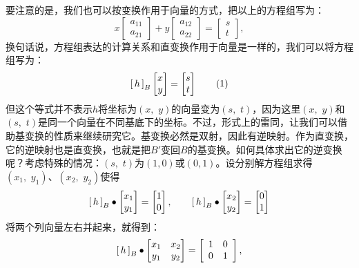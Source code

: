 \documentclass[12pt,UTF8]{ctexbook}
\begin{document}
要注意的是，我们也可以按变换作用于向量的方式，把以上的方程组写为：
$$ x\begin{bmatrix}
    a_{11}\\ a_{21} 
\end{bmatrix} + y \begin{bmatrix}
    a_{12}\\ a_{22}
\end{bmatrix} = \begin{bmatrix}
    s \\ t
\end{bmatrix},
$$
换句话说，方程组表达的计算关系和直变换作用于向量是一样的，我们可以将方程组写为：
\begin{equation*}
\bmat{h}[B] \begin{bmatrix}
    x\\y
\end{bmatrix}=\begin{bmatrix}
    s\\t
\end{bmatrix}\tag{1}
\end{equation*}
但这个等式并不表示$h$将坐标为$(x,\,\,y)$的向量变为$(s,\,\,t)$，因为这里$(x,\,\,y)$和$(s,\,\,t)$是同一个向量在不同基底下的坐标。不过，形式上的雷同，让我们可以借助基变换的性质来继续研究它。基变换必然是双射，因此有逆映射。作为直变换，它的逆映射也是直变换，也就是把$B'$变回$B$的基变换。如何具体求出它的逆变换呢？考虑特殊的情况：$(s,\,\,t)$为$(1,0)$或$(0,1)$。设分别解方程组求得$(x_1,\,\,y_1)$、$(x_2,\,\,y_2)$使得
$$
\bmat{h}[B]\bullet \begin{bmatrix}
    x_1\\y_1
\end{bmatrix}=\begin{bmatrix}
    1\\0
\end{bmatrix},\qquad
\bmat{h}[B]\bullet \begin{bmatrix}
    x_2\\y_2
\end{bmatrix}=\begin{bmatrix}
    0\\1
\end{bmatrix}
$$
将两个列向量左右并起来，就得到：
$$
\bmat{h}[B]\bullet \begin{bmatrix}
    x_1&x_2\\y_1&y_2
\end{bmatrix}=\begin{bmatrix}
    \phantom{0}1&0\phantom{0}\\\phantom{0}0&1\phantom{0}
\end{bmatrix},
$$
\end{document}
